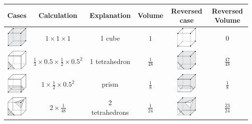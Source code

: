 \documentclass[11pt]{article}
\begin{document}
\begin{table}[]
    \centering
    \begin{tabular}{c|c|c|c|c|c}
        \textbf{Cases} & \textbf{Calculation} & \textbf{Explanation} & \textbf{Volume} & \textbf{Reversed case} & \textbf{Reversed Volume}\\
    \midrule
        \includegraphics[width=1cm]{Figures/case 1.png} & $1 \times 1 \times 1$ & 1 cube & $1$ & \includegraphics[width=1cm]{Figures/case 16.png} & $0$ \\
    
        \includegraphics[width=1cm]{Figures/case 2.png} & $\frac{1}{3} \times 0.5 \times \frac{1}{2} \times 0.5^2$ & 1 tetrahedron & $\frac{1}{48}$ & \includegraphics[width=1cm]{Figures/case 17.png} & $\frac{47}{48}$\\

        \includegraphics[width=1cm]{Figures/case 3.png} & $1 \times \frac{1}{2} \times 0.5^2$ & prism & $\frac{1}{8}$ & \includegraphics[width=1cm]{Figures/case 18.png} & $\frac{1}{8}$\\

        \includegraphics[width=1cm]{Figures/case 4.png} & $2 \times \frac{1}{48}$ & 2 tetrahedrons & $\frac{1}{24}$ & \includegraphics[width=1cm]{Figures/case 19.png} & $\frac{23}{24}$ \\


\end{tabular}
\end{table}
\end{document}
